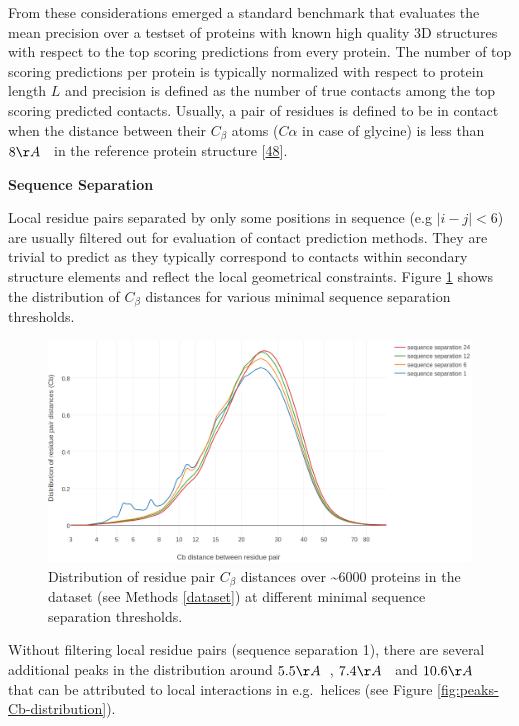 \documentclass[12pt,a4paper,twoside]{book}
\newcommand{\Cb}{C_\beta}
\theoremstyle{definition}
\theoremstyle{definition}
\theoremstyle{remark}
\begin{document}
From these considerations emerged a standard benchmark that evaluates
the mean precision over a testset of proteins with known high quality 3D
structures with respect to the top scoring predictions from every
protein. The number of top scoring predictions per protein is typically
normalized with respect to protein length \(L\) and precision is defined
as the number of true contacts among the top scoring predicted contacts.
Usually, a pair of residues is defined to be in contact when the
distance between their \(\Cb\) atoms (\(C\alpha\) in case of glycine) is
less than \(8 \AA \; \;\) in the reference protein structure
{[}\protect\hyperlink{ref-Monastyrskyy2015}{48}{]}.

\textbf{Sequence Separation}

Local residue pairs separated by only some positions in sequence (e.g
\(|i-j| < 6\)) are usually filtered out for evaluation of contact
prediction methods. They are trivial to predict as they typically
correspond to contacts within secondary structure elements and reflect
the local geometrical constraints. Figure \ref{fig:Cb-distribution}
shows the distribution of \(\Cb\) distances for various minimal sequence
separation thresholds.






\begin{figure}
\includegraphics[width=1\linewidth]{img/dataset_statistics/Cb_distribution_all_data43579541_log} \caption{Distribution of residue pair \(\Cb\)
distances over \textasciitilde{}6000 proteins in the dataset (see
Methods \ref{dataset}) at different minimal sequence separation
thresholds.}\label{fig:Cb-distribution}
\end{figure}

Without filtering local residue pairs (sequence separation 1), there are
several additional peaks in the distribution around \(5.5\AA \; \;\),
\(7.4\AA \; \;\) and \(10.6\AA \; \;\) that can be attributed to local
interactions in e.g.~helices (see Figure
\ref{fig:peaks-Cb-distribution}).
\end{document}
